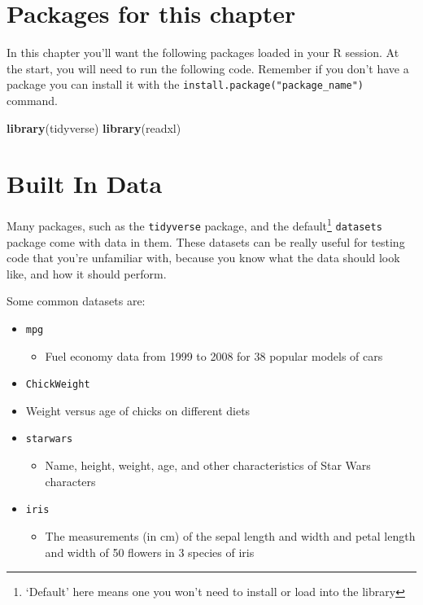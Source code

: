 \documentclass[
]{book}
\newenvironment{Shaded}{\begin{snugshade}}{\end{snugshade}}
\newcommand{\KeywordTok}[1]{\textcolor[rgb]{0.13,0.29,0.53}{\textbf{#1}}}
\newcommand{\NormalTok}[1]{#1}
\providecommand{\tightlist}{%
  \setlength{\itemsep}{0pt}\setlength{\parskip}{0pt}}
\begin{document}
\hypertarget{packages-for-this-chapter}{%
\section{Packages for this chapter}\label{packages-for-this-chapter}}

In this chapter you'll want the following packages loaded in your R session. At the start, you will need to run the following code. Remember if you don't have a package you can install it with the \texttt{install.package("package\_name")} command.

\begin{Shaded}
\begin{Highlighting}[]
\KeywordTok{library}\NormalTok{(tidyverse)}
\KeywordTok{library}\NormalTok{(readxl)}
\end{Highlighting}
\end{Shaded}

\hypertarget{data_builtin}{%
\section{Built In Data}\label{data_builtin}}

Many packages, such as the \texttt{tidyverse} package, and the default\footnote{`Default' here means one you won't need to install or load into the library} \texttt{datasets} package come with data in them. These datasets can be really useful for testing code that you're unfamiliar with, because you know what the data should look like, and how it should perform.

Some common datasets are:

\begin{itemize}
\item
  \texttt{mpg}

  \begin{itemize}
  \tightlist
  \item
    Fuel economy data from 1999 to 2008 for 38 popular models of cars
  \end{itemize}
\item
  \texttt{ChickWeight}
\item
  Weight versus age of chicks on different diets
\item
  \texttt{starwars}

  \begin{itemize}
  \tightlist
  \item
    Name, height, weight, age, and other characteristics of Star Wars characters
  \end{itemize}
\item
  \texttt{iris}

  \begin{itemize}
  \tightlist
  \item
    The measurements (in cm) of the sepal length and width and petal length and width of 50 flowers in 3 species of iris
  \end{itemize}
\end{itemize}
\end{document}

